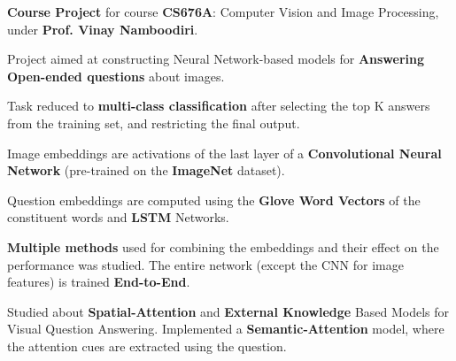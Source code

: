 \documentclass[a4paper]{norm-resume}
\begin{document}
\vspace{2mm} %

	\begin{tightitemize}
	\small
	{
	\item \textbf{Course Project} for course \textbf{CS676A}: Computer Vision and Image Processing, under \textbf{Prof. Vinay Namboodiri}.
	\item Project aimed at constructing Neural Network-based models for \textbf{Answering Open-ended questions} about images.
	\item Task reduced to \textbf{multi-class classification} after selecting the top K answers from the training set, and restricting the final output.
	\item Image embeddings are activations of the last layer of a \textbf{Convolutional Neural Network} (pre-trained on the \textbf{ImageNet} dataset).
	\item Question embeddings are computed using the \textbf{Glove Word Vectors} of the constituent words and \textbf{LSTM} Networks.
	\item \textbf{Multiple methods} used for combining the embeddings and their effect on the performance was studied. The entire network (except the CNN for image features) is trained \textbf{End-to-End}.
	\item Studied about \textbf{Spatial-Attention} and \textbf{External Knowledge} Based Models for Visual Question Answering. Implemented a \textbf{Semantic-Attention} model, where the attention cues are extracted using the question.
	}
	\end{tightitemize}

	\vspace{2mm}
\end{document}
